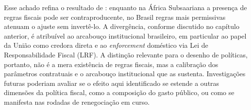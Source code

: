 Esse achado refina o resultado de : enquanto na África Subsaariana a presença de regras fiscais pode ser contraproducente, no Brasil regras mais permissivas atenuam o ajuste sem invertê-lo. A divergência, conforme discutido no capítulo anterior, é atribuível ao arcabouço institucional brasileiro, em particular ao papel da União como credora direta e ao \textit{enforcement} doméstico via Lei de Responsabilidade Fiscal (LRF). A distinção relevante para o desenho de políticas, portanto, não é a mera existência de regras fiscais, mas a calibração dos parâmetros contratuais e o arcabouço institucional que as sustenta. Investigações futuras poderiam avaliar se o efeito aqui identificado se estende a outras dimensões da política fiscal, como a composição do gasto público, ou como se manifesta nas rodadas de renegociação em curso.